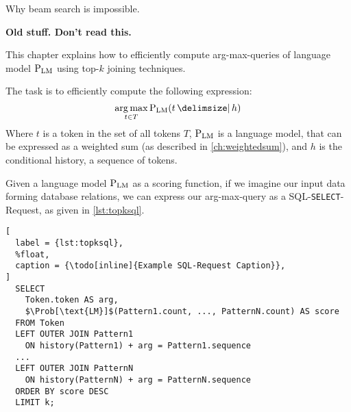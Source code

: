 \begin{draft}
Why beam search is impossible.
\end{draft}





























\clearpage
\textbf{Old stuff. Don't read this.}


This chapter explains how to efficiently compute arg-max-queries of language
model $\Prob[\text{LM}]$ using top-$k$ joining techniques.

The task is to efficiently compute the following expression:
\begin{equation}
  \Argmax{t \in T} \Prob[\text{LM}]{t}{h}
\end{equation}
Where $t$ is a token in the set of all tokens $T$, $\Prob[\text{LM}]$ is a
language model, that can be expressed as a weighted sum (as described in
\cref{ch:weightedsum}), and $h$ is the conditional history, a sequence
of tokens.

Given a language model $\Prob[\text{LM}]$ as a scoring function, if we
imagine our input data forming database relations, we can express our
arg-max-query as a SQL-\texttt{SELECT}-Request, as given in \cref{lst:topksql}.

\begin{lstlisting}[
  label = {lst:topksql},
  %float,
  caption = {\todo[inline]{Example SQL-Request Caption}},
]
  SELECT
    Token.token AS arg,
    $\Prob[\text{LM}]$(Pattern1.count, ..., PatternN.count) AS score
  FROM Token
  LEFT OUTER JOIN Pattern1
    ON history(Pattern1) + arg = Pattern1.sequence
  ...
  LEFT OUTER JOIN PatternN
    ON history(PatternN) + arg = PatternN.sequence
  ORDER BY score DESC
  LIMIT k;
\end{lstlisting}

